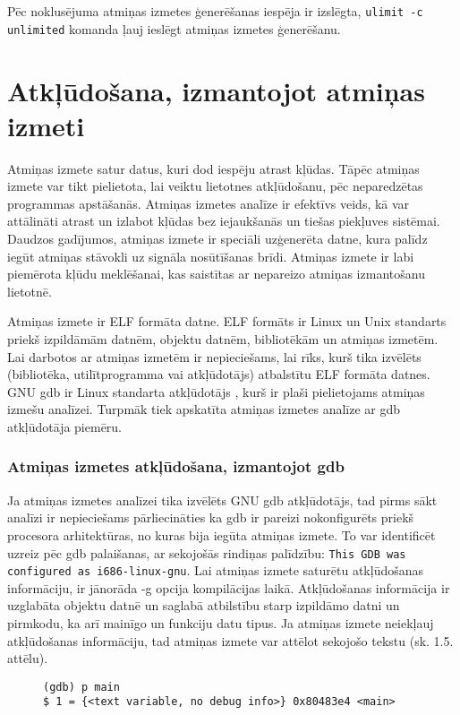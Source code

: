  Pēc noklusējuma atmiņas izmetes ģenerēšanas iespēja ir izslēgta,  \texttt{ulimit -c unlimited} komanda ļauj ieslēgt atmiņas izmetes ģenerēšanu.

\section{Atkļūdošana, izmantojot atmiņas izmeti}
Atmiņas izmete satur datus, kuri dod iespēju atrast kļūdas. Tāpēc atmiņas izmete var tikt pielietota, lai veiktu lietotnes atkļūdošanu, pēc neparedzētas programmas apstāšanās.
Atmiņas izmetes analīze ir efektīvs veids, kā var attālināti atrast un izlabot kļūdas bez iejaukšanās un tiešas piekļuves sistēmai.
Daudzos gadījumos, atmiņas izmete ir speciāli uzģenerēta datne, kura palīdz iegūt atmiņas stāvokli uz signāla nosūtīšanas brīdi.
Atmiņas izmete ir labi piemērota kļūdu meklēšanai, kas saistītas ar nepareizo atmiņas izmantošanu lietotnē.

Atmiņas izmete ir ELF formāta datne. 
ELF formāts ir Linux un Unix standarts priekš izpildāmām datnēm, objektu datnēm, bibliotēkām un atmiņas izmetēm.
Lai darbotos ar atmiņas izmetēm ir nepieciešams, lai rīks, kurš tika izvēlēts (bibliotēka, utilītprogramma vai atkļūdotājs) atbalstītu ELF formāta datnes.
GNU gdb ir  Linux standarta atkļūdotājs \cite{MWMK}, kurš ir plaši pielietojams atmiņas izmešu analīzei. 
Turpmāk tiek apskatīta atmiņas izmetes analīze ar gdb atkļūdotāja piemēru.

\subsubsection{Atmiņas izmetes atkļūdošana, izmantojot gdb }
Ja atmiņas izmetes analīzei tika izvēlēts GNU gdb atkļūdotājs, tad pirms sākt analīzi ir nepieciešams pārliecināties ka gdb ir pareizi nokonfigurēts priekš procesora arhitektūras, no kuras bija iegūta atmiņas izmete.
To var identificēt uzreiz pēc gdb palaišanas, ar sekojošās rindiņas palīdzību: \texttt{This GDB was configured as i686-linux-gnu}.  
Lai atmiņas izmete saturētu atkļūdošanas informāciju, ir jānorāda -g opcija kompilācijas laikā.
Atkļūdošanas informācija ir uzglabāta objektu datnē un saglabā atbilstību starp izpildāmo datni un pirmkodu, ka arī mainīgo un funkciju datu tipus.
Ja atmiņas izmete neiekļauj atkļūdošanas informāciju, tad atmiņas izmete var attēlot sekojošo tekstu (sk. 1.5. attēlu).

\begin{figure}[h]
\begin{lstlisting}
(gdb) p main
$ 1 = {<text variable, no debug info>} 0x80483e4 <main>
\end{lstlisting}
\caption{\textbf{\fontsize{11}{12}\selectfont {Atmiņas izmete nesatur atkļūdošanas informāciju}}}
\end{figure}

